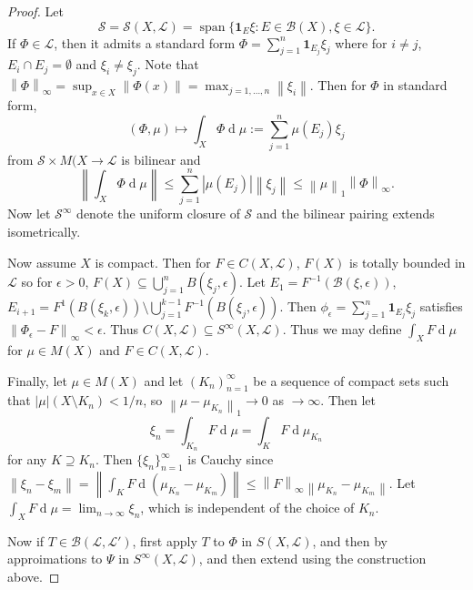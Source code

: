 \documentclass[11pt, a4paper]{memoir}
\newcommand{\norm}[1]{\ensuremath{\left\lVert#1\right\rVert}}
\theoremstyle{change}
\theoremstyle{plain}
\theoremstyle{nonumberplain}
\newtheorem{proof}{Proof}
\DeclareMathOperator{\spn}{span}
\renewcommand{\d}[1]{\ensuremath{\operatorname{d}\!{#1}}}
\newcommand{\idc}[1]{\ensuremath{\mathbf{1}_{#1}}}
\numberwithin{equation}{section}
\begin{document}
\begin{proof}
    Let
    \begin{equation*}
        \mathcal{S}=\mathcal{S}(X,\mathcal{L})=\spn\{\idc{E}\xi:E\in\mathcal{B}(X),\xi\in\mathcal{L}\}.
    \end{equation*}
    If $\Phi\in\mathcal{L}$, then it admits a standard form $\Phi=\sum_{j=1}^n \idc{E_j}\xi_j$ where for $i\neq j$, $E_i\cap E_j=\emptyset$ and $\xi_i\neq\xi_j$.
    Note that $\norm{\Phi}_\infty=\sup_{x\in X}\norm{\Phi(x)}=\max_{j=1,\ldots,n}\norm{\xi_i}$.
    Then for $\Phi$ in standard form,
    \begin{equation*}
        (\Phi,\mu)\mapsto\int_X\Phi\d{\mu}:=\sum_{j=1}^n\mu(E_j)\xi_j
    \end{equation*}
    from $\mathcal{S}\times M(X\to\mathcal{L}$ is bilinear and
    \begin{equation*}
        \norm{\int_X\Phi\d{\mu}}\leq \sum_{j=1}^n |\mu(E_j)|\norm{\xi_j}\leq\norm{\mu}_1\norm{\Phi}_\infty.
    \end{equation*}
    Now let $\mathcal{S}^\infty$ denote the uniform closure of $\mathcal{S}$ and the bilinear pairing extends isometrically.

    Now assume $X$ is compact.
    Then for $F\in C(X,\mathcal{L})$, $F(X)$ is totally bounded in $\mathcal{L}$ so for $\epsilon>0$, $F(X)\subseteq\bigcup_{j=1}^n B(\xi_j,\epsilon)$.
    Let $E_1=F^{-1}(\mathcal{B}(\xi,\epsilon))$, $E_{i+1}=F^{1}(B(\xi_k,\epsilon))\setminus\bigcup_{j=1}^{k-1}F^{-1}(B(\xi_j,\epsilon))$.
    Then $\phi_\epsilon=\sum_{j=1}^n\idc{E_j}\xi_j$ satisfies $\norm{\Phi_\epsilon-F}_\infty<\epsilon$.
    Thus $C(X,\mathcal{L})\subseteq S^\infty(X,\mathcal{L})$.
    Thus we may define $\int_X F\d{\mu}$ for $\mu\in M(X)$ and $F\in C(X,\mathcal{L})$.

    Finally, let $\mu\in M(X)$ and let $(K_n)_{n=1}^\infty$ be a sequence of compact sets such that $|\mu|(X\setminus K_n)<1/n$, so $\norm{\mu-\mu_{K_n}}_1\to 0$ as $\to\infty$.
    Then let
    \begin{equation*}
        \xi_n=\int_{K_n}F\d{\mu}=\int_KF\d{\mu_{K_n}}
    \end{equation*}
    for any $K\supseteq K_n$.
    Then $\{\xi_n\}_{n=1}^\infty$ is Cauchy since $\norm{\xi_n-\xi_m}=\norm{\int_K F\d{(\mu_{K_n}-\mu_{K_m})}}\leq\norm{F}_\infty\norm{\mu_{K_n}-\mu_{K_m}}$.
    Let $\int_X F\d{\mu}=\lim_{n\to\infty}\xi_n$, which is independent of the choice of $K_n$.

    Now if $T\in\mathcal{B}(\mathcal{L},\mathcal{L}')$, first apply $T$ to $\Phi$ in $S(X,\mathcal{L})$, and then by approimations to $\Psi$ in $S^\infty(X,\mathcal{L})$, and then extend using the construction above.
\end{proof}
\end{document}

